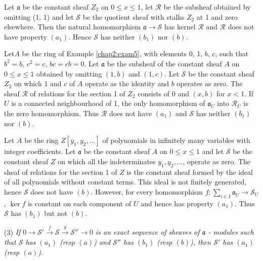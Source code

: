 \begin{exam}%
Let $\mathfrak{a}$ be the constant sheaf $Z_2$ on $0 \leq x \leq 1$, let
$\mathscr{R}$ be the subsheaf obtained by omitting (1, 1) and let
$\mathscr{S}$ be the quotient sheaf with stalks $Z_2$ at 1 and zero
elsewhere. Then the natural homomorphism $\mathfrak{a} \to \mathscr{S}$ has
kernel $\mathscr{R}$ and $\mathscr{R}$ does not have property
$(a_1)$. Hence $\mathscr{S}$ has neither $(b_1)$ nor $(b)$. 
\end{exam}

\begin{exam}%
Let\pageoriginale $A$ be the ring of Example \ref{chap2:exam5}, with
elements 0, 1, 
$b$, $c$, such 
that $b^2 = b$, $c^2=c$, $bc = cb = 0$. Let $\mathfrak{a}$ be the
subsheaf of the 
constant sheaf $A$ on $0 \leq x \leq 1$ obtained by omitting $(1, b)$
and $(1, c)$. Let $\mathscr{S}$ be the constant sheaf $Z_2$ on which
$1$ and $c$ of $A$ operate as the identity and $b$ operates as
zero. The sheaf $\mathscr{R}$ of relations for the section 1 of
$Z_2$ consists of 0 and $(x,b)$ for $x < 1$. If $U$ is a connected
neighbourhood of 1, the only homomorphism of $\mathfrak{a}_U$ into
$\mathscr{R}_U$ is the zero homomorphism. Thus $\mathscr{R}$ does not
have $(a_1)$ and $\mathscr{S}$ has neither $(b_1)$ nor $(b)$. 
\end{exam}

\begin{exam}%
Let $A$ be the ring $Z [ y_1, y_2,\ldots ]$ of polynomials in
infinitely many variables with integer coefficients. Let
$\mathfrak{a}$ be the 
constant sheaf $A$ on $0 \leq x \leq 1$ and let $\mathscr{S}$ be the
constant sheaf $Z$ on which all the indeterminates $y_1, y_2, \ldots$,
operate as zero. The sheaf of relations for the section 1 of $Z$ is
the constant sheaf formed by the ideal of all polynomials without
constant terms. This ideal is not finitely generated, hence
$\mathscr{S}$ does not have $(b)$. However, for every homomorphism $f
: \sum\limits_{i \in I} \mathfrak{a}_U \to \mathscr{S}_U$, $\ker f$ is
constant on each component of $U$ and hence has property $(a_1)$. Thus 
$\mathscr{S}$ has $(b_1)$ but not $(b)$. 
\end{exam}

\noindent
(3) \qquad \textit {If $ 0 \to \mathscr{S}' \xrightarrow{f}
  \mathscr{S}  \xrightarrow{g} \mathscr{S}'' \rightarrow 0$ is an
  exact sequence of sheaves of $\mathfrak{a}$ - modules such that
  $\mathscr{S}$ has $(a_1)$ (resp $(a)$) and $\mathscr{S}''$ has
  $(b_1)$ (resp $(b)$), then $\mathscr{S}'$ has $(a_1)$ (resp
  $(a)$).}  

